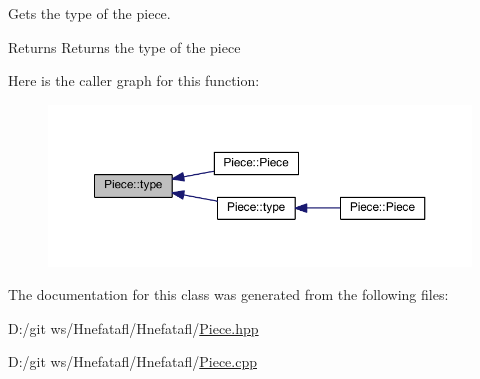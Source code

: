 Gets the type of the piece. 

\begin{DoxyReturn}{Returns}
Returns the type of the piece 
\end{DoxyReturn}


Here is the caller graph for this function\-:\nopagebreak
\begin{figure}[H]
\begin{center}
\leavevmode
\includegraphics[width=350pt]{class_piece_a64d970cf7c3d34014d8a36cc3bd3c908_icgraph}
\end{center}
\end{figure}




The documentation for this class was generated from the following files\-:\begin{DoxyCompactItemize}
\item 
D\-:/git ws/\-Hnefatafl/\-Hnefatafl/\hyperlink{_piece_8hpp}{Piece.\-hpp}\item 
D\-:/git ws/\-Hnefatafl/\-Hnefatafl/\hyperlink{_piece_8cpp}{Piece.\-cpp}\end{DoxyCompactItemize}
